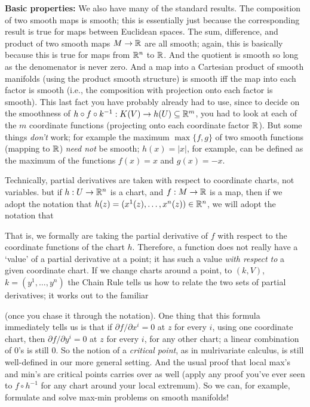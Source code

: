 {\bf Basic properties:} We also have many of the standard results. The composition of two smooth maps is smooth;
this is essentially just because the corresponding result is true for maps between
Euclidean spaces. The sum, difference, and product of two smooth maps $M\rightarrow{\Bbb R}$
are all smooth; again, this is basically because this is true for maps from ${\Bbb R}^n$ to ${\Bbb R}$.
And the quotient is smooth so long as the denomenator is never zero. And a map into a Cartesian 
product of smooth manifolds (using the product smooth structure) is smooth iff the map into
each factor is smooth (i.e., the composition with projection onto each factor is smooth). 
This last fact you have probably already had to use, since to decide
on the smoothness of $h\circ f \circ k^{-1}:K(V)\rightarrow h(U)\subseteq {\Bbb R}^m$, 
you had to look at each of the $m$ coordinate functions (projecting onto each coordinate 
factor ${\Bbb R}$). But some things {\it don't} work; for example the maximum $\max\{f,g\}$
of two smooth functions (mapping to ${\Bbb R}$) {\it need not} be smooth; $h(x)=|x|$, for example, can 
be defined as the maximum of the functions $f(x)=x$ and $g(x)=-x$.

\ssk

Technically, partial derivatives are taken with respect to coordinate charts, not variables.
but if $h:U\rightarrow {\Bbb R}^n$ is a chart, and $f:M\rightarrow {\Bbb R}$ is a map, then
if we adopt the notation that $h(z)=(x^1(z),\ldots ,x^n(z))\in {\Bbb R}^n$, we will adopt 
the notation that 


\noindent That is, we formally are taking the partial derivative of $f$ with respect to the
coordinate functions of the chart $h$. Therefore, a function does 
not really have a `value' of a partial derivative at a point; it has such a value 
{\it with respect to} a given coordinate chart. If we change charts around a point, to
$(k,V)$, $k=(y^1,\ldots ,y^n)$ the Chain Rule tells us how to relate the two sets of 
partial derivatives; it works out to the familiar


\noindent (once you chase it through the notation). One thing that this formula
immediately tells us is that if $\partial f/\partial x^i = 0$ at $z$ for every $i$,
using one coordinate chart, 
then $\partial f/\partial y^i = 0$ at $z$ for every $i$, for any other chart;
a linear combination of $0$'s is still $0$. So the notion of a {\it critical point},
as in mulrivariate calculus, is still well-defined in our more general setting. And
the usual proof that local max's and min's are critical points carries over as
well (apply any proof you've ever seen to $f\circ h^{-1}$ for any chart around
your local extremum). So we can, for example, formulate and solve max-min problems
on smooth manifolds!

